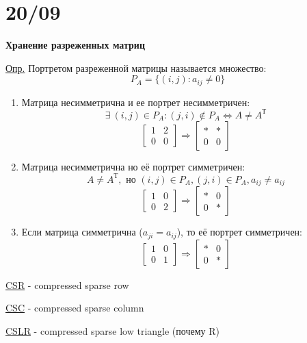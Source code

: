\documentclass{bmstu}
\begin{document}
	
	\section*{20/09}
	
	\begin{center}
		\textbf{Хранение разреженных матриц}
	\end{center}
	
		\underline{Опр.} Портретом разреженной матрицы называется множество:
		\[
		P_A=\{(i,j):a_{ij}\neq0\}
		\]
		
		\begin{enumerate}
			\item Матрица несимметрична и ее портрет несимметричен:
			\[
			\exists \ (i, j) \in P_A: (j, i) \notin P_A \Leftrightarrow A\neq A^{\text{Т}}
			\]
			\[
			\begin{bmatrix}
				1&2 \\ 0&0
			\end{bmatrix}
			\Rightarrow 
			\begin{bmatrix}
				\ast&\ast \\ 0&0
			\end{bmatrix}
			\]
			\item Матрица несимметрична но её портрет симметричен:
			\[
			A\neq A^{\text{Т}}, \text{ но } (i, j) \in P_A, (j, i) \in P_A, a_{ij}\neq a_{ij}
			\]
			\[
			\begin{bmatrix}
				1&0 \\ 0&2
			\end{bmatrix}
			\Rightarrow 
			\begin{bmatrix}
				\ast&0 \\ 0&\ast
			\end{bmatrix}
			\]
			\item Если матрица симметрична ($a_{ji}=a_{ij}$), то её портрет симметричен:
			\[
			\begin{bmatrix}
				1&0 \\ 0&1
			\end{bmatrix}
			\Rightarrow 
			\begin{bmatrix}
				\ast&0 \\ 0&\ast
			\end{bmatrix}
			\]
		\end{enumerate}
		
\underline{CSR} - compressed sparse row

\underline{CSC} - compressed sparse column

\underline{CSLR} - compressed sparse low triangle (почему R)
\end{document}
